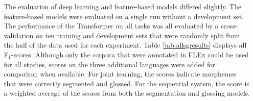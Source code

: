 The evaluation of deep learning and feature-based models differed slightly. The feature-based models were evaluated on a single run without a development set. The performance of the Transformer on all tasks was all evaluated by a cross-validation on ten training and development sets that were randomly split from the half of the data used for each experiment. Table \ref{tab:allsgresults} displays all F$_1$-scores. Although only the corpora that were annotated in FLEx could be used for all studies, scores on the three additional languages were added for comparison when available.
For joint learning, the scores indicate morphemes that were correctly segmented and glossed. For the sequential system, the score is a weighted average of the scores from both the segmentation and glossing models. 

